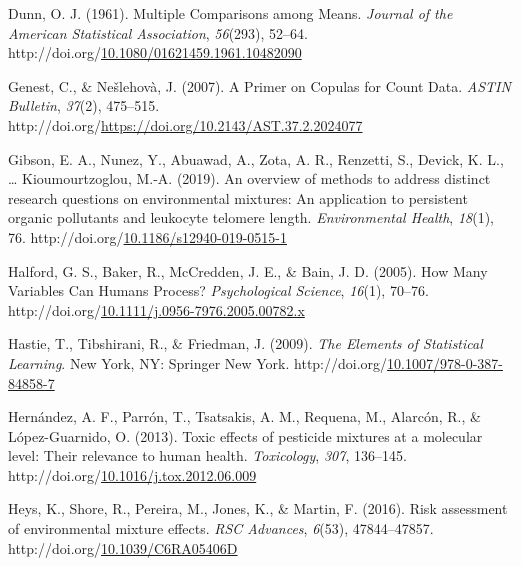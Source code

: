 \documentclass[12pt, twoside]{amherstthesis}
\newenvironment{CSLReferences}[2]%
  {}%
  {\par}
\begin{document}
\begin{CSLReferences}{1}{0}
\leavevmode{}%
Dunn, O. J. (1961). Multiple {Comparisons} among {Means}. \emph{Journal of the American Statistical Association}, \emph{56}(293), 52--64. http://doi.org/\href{https://doi.org/10.1080/01621459.1961.10482090}{10.1080/01621459.1961.10482090}

\leavevmode{}%
Genest, C., \& Nešlehovà, J. (2007). A {Primer} on {Copulas} for {Count} {Data}. \emph{ASTIN Bulletin}, \emph{37}(2), 475--515. http://doi.org/\url{https://doi.org/10.2143/AST.37.2.2024077}

\leavevmode{}%
Gibson, E. A., Nunez, Y., Abuawad, A., Zota, A. R., Renzetti, S., Devick, K. L., \ldots{} Kioumourtzoglou, M.-A. (2019). An overview of methods to address distinct research questions on environmental mixtures: An application to persistent organic pollutants and leukocyte telomere length. \emph{Environmental Health}, \emph{18}(1), 76. http://doi.org/\href{https://doi.org/10.1186/s12940-019-0515-1}{10.1186/s12940-019-0515-1}

\leavevmode{}%
Halford, G. S., Baker, R., McCredden, J. E., \& Bain, J. D. (2005). How {Many} {Variables} {Can} {Humans} {Process}? \emph{Psychological Science}, \emph{16}(1), 70--76. http://doi.org/\href{https://doi.org/10.1111/j.0956-7976.2005.00782.x}{10.1111/j.0956-7976.2005.00782.x}

\leavevmode{}%
Hastie, T., Tibshirani, R., \& Friedman, J. (2009). \emph{The {Elements} of {Statistical} {Learning}}. New York, NY: Springer New York. http://doi.org/\href{https://doi.org/10.1007/978-0-387-84858-7}{10.1007/978-0-387-84858-7}

\leavevmode{}%
Hernández, A. F., Parrón, T., Tsatsakis, A. M., Requena, M., Alarcón, R., \& López-Guarnido, O. (2013). Toxic effects of pesticide mixtures at a molecular level: {Their} relevance to human health. \emph{Toxicology}, \emph{307}, 136--145. http://doi.org/\href{https://doi.org/10.1016/j.tox.2012.06.009}{10.1016/j.tox.2012.06.009}

\leavevmode{}%
Heys, K., Shore, R., Pereira, M., Jones, K., \& Martin, F. (2016). Risk assessment of environmental mixture effects. \emph{RSC Advances}, \emph{6}(53), 47844--47857. http://doi.org/\href{https://doi.org/10.1039/C6RA05406D}{10.1039/C6RA05406D}


\end{CSLReferences}
\end{document}
